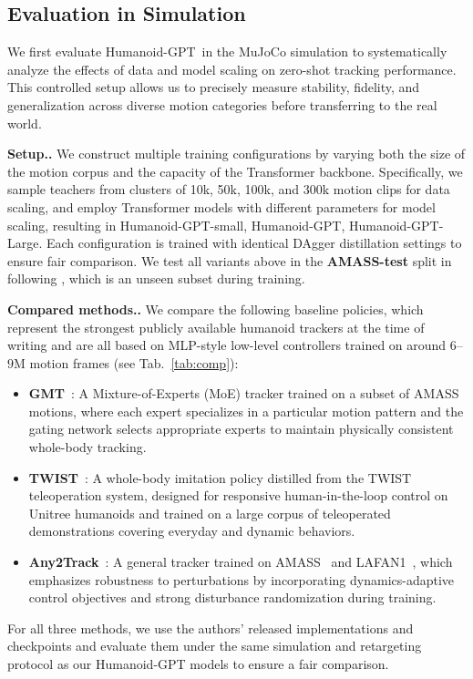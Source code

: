 \documentclass{llmxive}
\providecommand{\paragraph}[1]{\vspace{.5em}\noindent\textbf{#1.}}
\providecommand{\methodname}{Humanoid-GPT\xspace}
\begin{document}
\subsection{Evaluation in Simulation}
We first evaluate \methodname\ in the MuJoCo simulation to systematically analyze the effects of data and model scaling on zero-shot tracking performance. 
This controlled setup allows us to precisely measure stability, fidelity, 
and generalization across diverse motion categories before transferring to the real world.

\paragraph{Setup.}
We construct multiple training configurations by varying both the size of the motion corpus and the capacity of the Transformer backbone. 
Specifically, we sample teachers from clusters of 10k, 50k, 100k, and 300k motion clips for data scaling, and employ Transformer models with different parameters for model scaling, resulting in \methodname-small, \methodname, \methodname-Large. Each configuration is trained with identical DAgger distillation settings to ensure fair comparison. We test all variants above in the \textbf{AMASS-test} split in \citep{amass19} following \citep{phc23}, which is an unseen subset during training.

\paragraph{Compared methods.}
We compare the following baseline policies, which represent the strongest publicly available humanoid trackers at the time of writing and are all based on MLP-style low-level controllers trained on around $6$--$9$M motion frames (see Tab.~\ref{tab:comp}):
\begin{itemize}[leftmargin=1.0em]
    \item \textbf{GMT}~\cite{gmt25}: A Mixture-of-Experts (MoE) tracker trained on a subset of AMASS~\cite{amass19} motions, where each expert specializes in a particular motion pattern and the gating network selects appropriate experts to maintain physically consistent whole-body tracking.
    \item \textbf{TWIST}~\cite{twist25}: A whole-body imitation policy distilled from the TWIST teleoperation system, designed for responsive human-in-the-loop control on Unitree humanoids and trained on a large corpus of teleoperated demonstrations covering everyday and dynamic behaviors.
    \item \textbf{Any2Track}~\cite{any2track25}: A general tracker trained on AMASS~\cite{amass19} and LAFAN1~\cite{lafan20}, which emphasizes robustness to perturbations by incorporating dynamics-adaptive control objectives and strong disturbance randomization during training.
\end{itemize}
For all three methods, we use the authors' released implementations and checkpoints and evaluate them under the same simulation and retargeting protocol as our Humanoid-GPT models to ensure a fair comparison.
\end{document}
